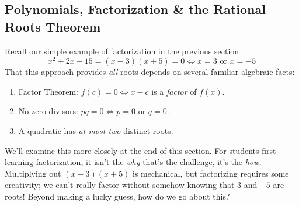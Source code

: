 \clearpage



\subsection{Polynomials, Factorization \& the Rational Roots Theorem}

Recall our simple example of factorization in the previous section
\[
	x^2+2x-15=(x-3)(x+5)=0\iff x=3\text{ or }x=-5
\]
That this approach provides \emph{all} roots depends on several familiar algebraic facts:
\begin{enumerate}
  \item Factor Theorem: $f(c)=0\iff x-c$ is a \emph{factor} of $f(x)$.
  \item No zero-divisors: $pq=0\iff p=0$ or $q=0$. 
  \item A quadratic has \emph{at most two} distinct roots.
\end{enumerate}
We'll examine this more closely at the end of this section. For students first learning factorization, it isn't the \emph{why} that's the challenge, it's the \emph{how.} Multiplying out $(x-3)(x+5)$ is mechanical, but factorizing requires some creativity; we can't really factor without somehow knowing that 3 and $-5$ are roots! Beyond making a lucky guess, how do we go about this? 

